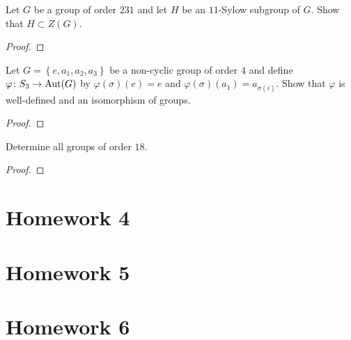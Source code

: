 \begin{problem}
Let $G$ be a group of order $231$ and let $H$ be an $11$-Sylow subgroup of
$G$. Show that $H\subset Z(G)$.
\end{problem}
\begin{proof}
\end{proof}

\begin{problem}
Let $G=\left\{e,a_1,a_2,a_3\right\}$ be a non-cyclic group of order $4$ and
define $\varphi\colon S_3\to\operatorname{Aut}(G)$ by $\varphi(\sigma)(e)=e$ and
$\varphi(\sigma)(a_1)=a_{\sigma(i)}$. Show that $\varphi$ is well-defined and an
isomorphism of groups.
\end{problem}
\begin{proof}
\end{proof}

\begin{problem}
Determine all groups of order $18$.
\end{problem}
\begin{proof}
\end{proof}

\section{Homework 4}
\begin{problem}

\end{problem}

\section{Homework 5}


\section{Homework 6}


